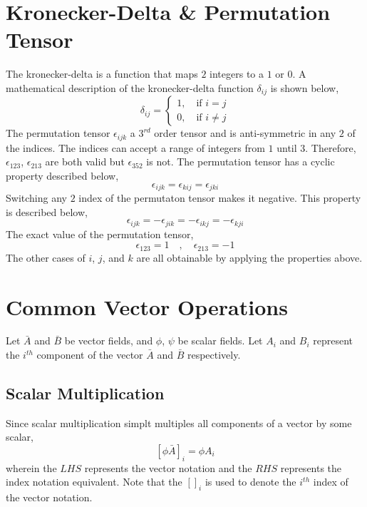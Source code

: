 \section{Kronecker-Delta \& Permutation Tensor}
\begin{comment}
\end{comment}
The kronecker-delta is a function that maps $2$ integers to a $1$ or $0$. A mathematical description of the kronecker-delta function $\delta_{ij}$ is shown below,
$$\delta_{ij} = \begin{cases}
1,\quad \text{if } i = j \\
0,\quad \text{if } i\neq j
\end{cases}$$
The permutation tensor $\epsilon_{ijk}$ a $3^{rd}$ order tensor and is anti-symmetric in any $2$ of the indices. The indices can accept a range of integers from $1$ until $3$. Therefore, $\epsilon_{123}$, $\epsilon_{213}$ are both valid but $\epsilon_{352}$ is not. The permutation tensor has a cyclic property described below,
$$\epsilon_{ijk} = \epsilon_{kij} = \epsilon_{jki}$$
Switching any $2$ index of the permutaton tensor makes it negative. This property is described below,
$$\epsilon_{ijk} = -\epsilon_{jik} = -\epsilon_{ikj} = -\epsilon_{kji}$$
The exact value of the permutation tensor,
$$\epsilon_{123} = 1 \quad,\quad \epsilon_{213} = -1$$
The other cases of $i$, $j$, and $k$ are all obtainable by applying the properties above.
\section{Common Vector Operations}
\begin{comment}
\end{comment}
Let $\bar{A}$ and $\bar{B}$ be vector fields, and $\phi$, $\psi$ be scalar fields. Let $A_{i}$ and $B_{i}$ represent the $i^{th}$ component of the vector $\bar{A}$ and $\bar{B}$ respectively.
\subsection{Scalar Multiplication}
\begin{comment}
\end{comment}
Since scalar multiplication simplt multiples all components of a vector by some scalar,
$$\left[\phi\bar{A}\right]_{i} = \phi A_{i}$$
wherein the $LHS$ represents the vector notation and the $RHS$ represents the index notation equivalent. Note that the $[]_{i}$ is used to denote the $i^{th}$ index of the vector notation.
